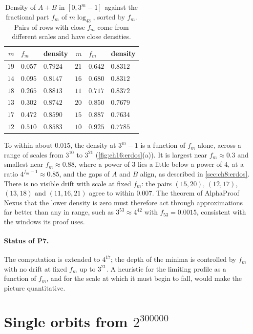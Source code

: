 \begin{table}[t]
\centering\small
\caption{Density of $A+B$ in $[0,3^m-1]$ against the fractional part $f_m$ of
$m\log_43$, sorted by $f_m$. Pairs of rows with close $f_m$ come from different
scales and have close densities.}
\label{tab:ch16:erdos}
\begin{tabular}{@{}rll@{\qquad}rll@{}}
\toprule
$m$ & $f_m$ & density & $m$ & $f_m$ & density \\
\midrule
$19$ & $0.057$ & $0.7924$ & $21$ & $0.642$ & $0.8312$ \\
$14$ & $0.095$ & $0.8147$ & $16$ & $0.680$ & $0.8312$ \\
$18$ & $0.265$ & $0.8813$ & $11$ & $0.717$ & $0.8372$ \\
$13$ & $0.302$ & $0.8742$ & $20$ & $0.850$ & $0.7679$ \\
$17$ & $0.472$ & $0.8590$ & $15$ & $0.887$ & $0.7634$ \\
$12$ & $0.510$ & $0.8583$ & $10$ & $0.925$ & $0.7785$ \\
\bottomrule
\end{tabular}
\end{table}

To within about $0.015$, the density at $3^m-1$ is a function of $f_m$ alone,
across a range of scales from $3^{10}$ to $3^{21}$
(\cref{fig:ch16:erdos}(a)). It is largest near $f_m\approx0.3$ and smallest near
$f_m\approx0.88$, where a power of $3$ lies a little below a power of $4$, at a
ratio $4^{f_m-1}\approx0.85$, and the gaps of $A$ and $B$ align, as described in
\cref{sec:ch8:erdos}. There is no visible drift with scale at fixed $f_m$: the pairs
$(15,20)$, $(12,17)$, $(13,18)$ and $(11,16,21)$ agree to within $0.007$. The
theorem of AlphaProof Nexus that the lower density is zero must therefore act
through approximations far better than any in range, such as
$3^{53}\approx4^{42}$ with $f_{53}=0.0015$, consistent with the windows its proof
uses.

\paragraph{Status of P7.} The computation is extended to $4^{17}$; the depth of
the minima is controlled by $f_m$ with no drift at fixed $f_m$ up to $3^{21}$. A
heuristic for the limiting profile as a function of $f_m$, and for the scale at
which it must begin to fall, would make the picture quantitative.

\section{Single orbits from \texorpdfstring{$2^{300000}$}{2 to the 300000}}\label{sec:ch16:p3}

